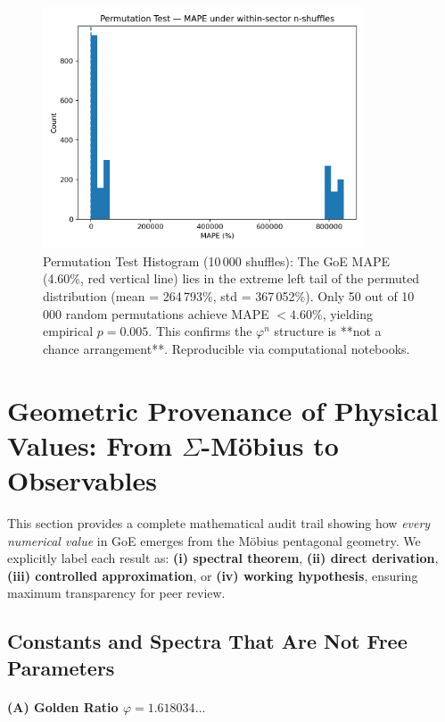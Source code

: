 \documentclass[12pt]{article}
\begin{document}
\begin{figure}[H]
\centering
\includegraphics[width=0.85\textwidth]{figures/permutation_mape_hist.png}
\caption{Permutation Test Histogram (10\,000 shuffles): The GoE MAPE (4.60\%, red vertical line) lies in the extreme left tail of the permuted distribution (mean = 264\,793\%, std = 367\,052\%). Only 50 out of 10\,000 random permutations achieve MAPE $< 4.60\%$, yielding empirical $p = 0.005$. This confirms the $\varphi^n$ structure is **not a chance arrangement**. Reproducible via computational notebooks.}
\label{fig:permutation}
\end{figure}

\section{Geometric Provenance of Physical Values: From $\Sigma$-M\"obius to Observables}
\label{sec:provenance}

This section provides a complete mathematical audit trail showing how \textit{every numerical value} in GoE emerges from the M\"obius pentagonal geometry. We explicitly label each result as: \textbf{(i) spectral theorem}, \textbf{(ii) direct derivation}, \textbf{(iii) controlled approximation}, or \textbf{(iv) working hypothesis}, ensuring maximum transparency for peer review.

\subsection{Constants and Spectra That Are Not Free Parameters}

\paragraph{(A) Golden Ratio $\varphi = 1.618034\ldots$}
\end{document}

